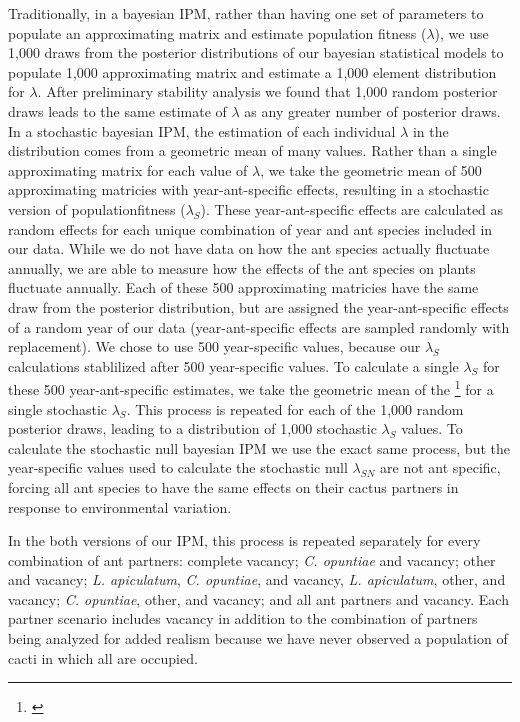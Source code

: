 \documentclass[11pt]{article}
\newcommand{\ali}[2]{{\color{blue}{#1}}\footnote{\textit{\color{blue}{#2}}}}
\begin{document}
Traditionally, in a bayesian IPM, rather than having one set of parameters to populate an approximating matrix and estimate population fitness ($\lambda$), we use 1,000 draws from the posterior distributions of our bayesian statistical models to populate 1,000 approximating matrix and estimate a 1,000 element distribution for $\lambda$.
After preliminary stability analysis we found that 1,000 random posterior draws leads to the same estimate of $\lambda$ as any greater number of posterior draws.
In a stochastic bayesian IPM, the estimation of each individual $\lambda$ in the distribution comes from a geometric mean of many values. 
Rather than a single approximating matrix for each value of $\lambda$, we take the geometric mean of 500 approximating matricies with year-ant-specific effects, resulting in a stochastic version of populationfitness ($\lambda_{S}$).
These year-ant-specific effects are calculated as random effects for each unique combination of year and ant species included in our data. 
While we do not have data on how the ant species actually fluctuate annually, we are able to measure how the effects of the ant species on plants fluctuate annually.
Each of these 500 approximating matricies have the same draw from the posterior distribution, but are assigned the year-ant-specific effects of a random year of our data (year-ant-specific effects are sampled randomly with replacement).
We chose to use 500 year-specific values, because our $\lambda_{S}$ calculations stablilized after 500 year-specific values. 
To calculate a single $\lambda_{S}$ for these 500 year-ant-specific estimates, we take the geometric mean of the \ali{500 dominant eigenvalues}{OK, I am not positive this is correct, but I have forgotten how to correctly describe it. Can we talk through this sentence?} for a single stochastic $\lambda_{S}$.
This process is repeated for each of the 1,000 random posterior draws, leading to a distribution of 1,000 stochastic $\lambda_{S}$ values. 
To calculate the stochastic null bayesian IPM we use the exact same process, but the year-specific values used to calculate the stochastic null $\lambda_{SN}$ are not ant specific, forcing all ant species to have the same effects on their cactus partners in response to environmental variation.

In the both versions of our IPM, this process is repeated separately for every combination of ant partners: complete vacancy; \textit{C. opuntiae} and vacancy; other and vacancy; \textit{L. apiculatum}, \textit{C. opuntiae}, and vacancy, \textit{L. apiculatum}, other, and vacancy; \textit{C. opuntiae}, other, and vacancy; and all ant partners and vacancy.
Each partner scenario includes vacancy in addition to the combination of partners being analyzed for added realism because we have never observed a population of cacti in which all are occupied. 
\end{document}
